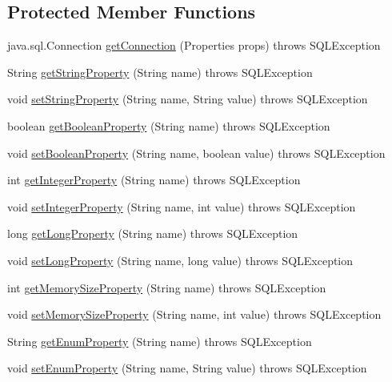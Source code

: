 \subsection*{Protected Member Functions}
\begin{DoxyCompactItemize}
\item 
java.\+sql.\+Connection \mbox{\hyperlink{classcom_1_1mysql_1_1cj_1_1jdbc_1_1_mysql_data_source_a914987783b972cea698bea74567fb862}{get\+Connection}} (Properties props)  throws S\+Q\+L\+Exception 
\item 
String \mbox{\hyperlink{classcom_1_1mysql_1_1cj_1_1jdbc_1_1_mysql_data_source_a83142037c1220669d7c3347380e09651}{get\+String\+Property}} (String name)  throws S\+Q\+L\+Exception 
\item 
void \mbox{\hyperlink{classcom_1_1mysql_1_1cj_1_1jdbc_1_1_mysql_data_source_a334cf512df25113c3275e866ddd91cf8}{set\+String\+Property}} (String name, String value)  throws S\+Q\+L\+Exception 
\item 
boolean \mbox{\hyperlink{classcom_1_1mysql_1_1cj_1_1jdbc_1_1_mysql_data_source_a28b736962f570b35aacdbadce82529aa}{get\+Boolean\+Property}} (String name)  throws S\+Q\+L\+Exception 
\item 
void \mbox{\hyperlink{classcom_1_1mysql_1_1cj_1_1jdbc_1_1_mysql_data_source_adc84490058d4bd47e16af04970d934a0}{set\+Boolean\+Property}} (String name, boolean value)  throws S\+Q\+L\+Exception 
\item 
int \mbox{\hyperlink{classcom_1_1mysql_1_1cj_1_1jdbc_1_1_mysql_data_source_a13cc2819160f4ee511406aa64d29c394}{get\+Integer\+Property}} (String name)  throws S\+Q\+L\+Exception 
\item 
void \mbox{\hyperlink{classcom_1_1mysql_1_1cj_1_1jdbc_1_1_mysql_data_source_a1eddd2db22a8e1e9dc0e3635834e132d}{set\+Integer\+Property}} (String name, int value)  throws S\+Q\+L\+Exception 
\item 
long \mbox{\hyperlink{classcom_1_1mysql_1_1cj_1_1jdbc_1_1_mysql_data_source_a4bfc0b60a4e40ad406e2a9f1b55ab1d4}{get\+Long\+Property}} (String name)  throws S\+Q\+L\+Exception 
\item 
void \mbox{\hyperlink{classcom_1_1mysql_1_1cj_1_1jdbc_1_1_mysql_data_source_a540318fe0f1175849a5773300ec4fa26}{set\+Long\+Property}} (String name, long value)  throws S\+Q\+L\+Exception 
\item 
int \mbox{\hyperlink{classcom_1_1mysql_1_1cj_1_1jdbc_1_1_mysql_data_source_a61f6c9894994c146027c18d42b2fffe2}{get\+Memory\+Size\+Property}} (String name)  throws S\+Q\+L\+Exception 
\item 
void \mbox{\hyperlink{classcom_1_1mysql_1_1cj_1_1jdbc_1_1_mysql_data_source_aed210876accef1c6217580a80e5f506b}{set\+Memory\+Size\+Property}} (String name, int value)  throws S\+Q\+L\+Exception 
\item 
String \mbox{\hyperlink{classcom_1_1mysql_1_1cj_1_1jdbc_1_1_mysql_data_source_aedb4c78ad9bdbcf248e480746018eea1}{get\+Enum\+Property}} (String name)  throws S\+Q\+L\+Exception 
\item 
void \mbox{\hyperlink{classcom_1_1mysql_1_1cj_1_1jdbc_1_1_mysql_data_source_a41b6d09a1910df978d413640730523a9}{set\+Enum\+Property}} (String name, String value)  throws S\+Q\+L\+Exception 
\end{DoxyCompactItemize}
